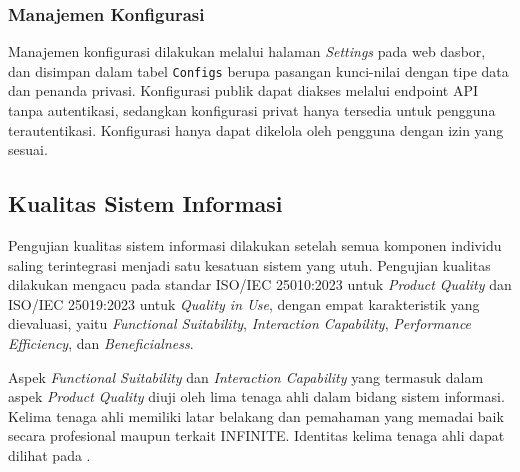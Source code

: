 \subsubsection{Manajemen Konfigurasi}

Manajemen konfigurasi dilakukan melalui halaman \textit{Settings} pada web dasbor, dan disimpan dalam tabel \texttt{Configs} berupa pasangan kunci-nilai dengan tipe data dan penanda privasi. Konfigurasi publik dapat diakses melalui endpoint API tanpa autentikasi, sedangkan konfigurasi privat hanya tersedia untuk pengguna terautentikasi. Konfigurasi hanya dapat dikelola oleh pengguna dengan izin yang sesuai.

\subsection{Kualitas Sistem Informasi}

Pengujian kualitas sistem informasi dilakukan setelah semua komponen individu saling terintegrasi menjadi satu kesatuan sistem yang utuh. Pengujian kualitas dilakukan mengacu pada standar ISO/IEC 25010:2023 untuk \textit{Product Quality} dan ISO/IEC 25019:2023 untuk \textit{Quality in Use}, dengan empat karakteristik yang dievaluasi, yaitu \textit{Functional Suitability}, \textit{Interaction Capability}, \textit{Performance Efficiency}, dan \textit{Beneficialness}.

Aspek \textit{Functional Suitability} dan \textit{Interaction Capability} yang termasuk dalam aspek \textit{Product Quality} diuji oleh lima tenaga ahli dalam bidang sistem informasi. Kelima tenaga ahli memiliki latar belakang dan pemahaman yang memadai baik secara profesional maupun terkait INFINITE. Identitas kelima tenaga ahli dapat dilihat pada .

